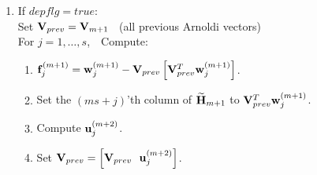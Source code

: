 \documentclass{article}
\newcommand{\bE}{{\bf E}}
\newcommand{\bF}{{\bf F}}
\newcommand{\bG}{{\bf G}}
\newcommand{\bH}{{\bf H}}
\newcommand{\bU}{{\bf U}}
\newcommand{\bV}{{\bf V}}
\newcommand{\bW}{{\bf W}}
\newcommand{\bu}{{\bf u}}
\newcommand{\bw}{{\bf w}}
\begin{document}
{\begin{figure}
\begin{description}
\begin{enumerate}
\begin{enumerate}
\begin{itemize}
\item If no dependencies exist, compute
\begin{itemize}
\item $ \bF^{(m+1)} = \bU^{(m+2)} \bG_{m+2,m+1}$
     \begin{itemize}

      \item If the columns of $\bF^{(m+1)}$ are linearly
      independent, set \\

      $\bH_{m+1} = \left[\begin{array}{cc}
                             \bH_m & \bV_m^T \bW^{(m+1)} \\
                             \bG_{m+1,m} \bE_m^T & \bG_{m+1,m+1}
                        \end{array}\right]$, \\
                         ~~~~~~${\widetilde \bH}_{m+1} = \left[
                        \begin{array}{c} \bH_{m+1} \\
             \bG_{m+2,m+1} \end{array} \right] $, and \\
      $\bV_{m+2} = \left[ \bV_{m+1} ~~ \bU^{(m+2)} \right]$.


      \item If the columns of $\bF^{(m+1)}$ are linearly
      dependent, set $depflg = true$, and recompute $\bF^{(m+1)}$ using step 3.

      \end{itemize}
\end{itemize}

\item If dependencies exist
\begin{itemize}
\item Set $depflg = true$, recompute $\bF^{(m+1)}$
      using step 3 below.
\end{itemize}

\end{itemize}

\end{enumerate}

\item If $depflg = true$: \\
Set $\bV_{prev} = \bV_{m+1}$ ~(all previous Arnoldi vectors) \\
For $j = 1, \ldots, s$,~~Compute:
\begin{enumerate}

\item ${\bf f}_j^{(m+1)} = \bw_j^{(m+1)} - \bV_{prev} \left[ \bV_{prev}^T \bw_j^{(m+1)} \right]$.
\item Set the $(ms+j)$'th column of ${\widetilde \bH}_{m+1}$ to
$\bV_{prev}^T \bw_j^{(m+1)}$.
\item Compute $\bu_j^{(m+2)}$.
\item Set $\bV_{prev} = \left[ \bV_{prev} ~~ \bu_j^{(m+2)} \right]$.


\end{enumerate}
\end{enumerate}
\end{description}
\end{figure}}
\end{document}
